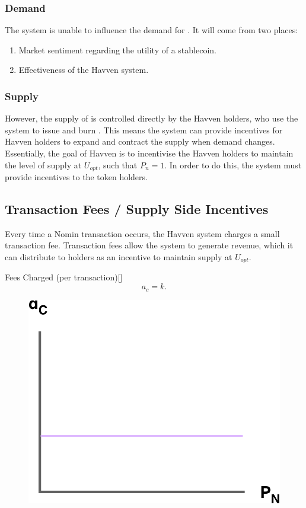 \subsubsection*{Demand}

\noindent The system is unable to influence the demand for \NOM{}. It will come from two places:
 
\begin{enumerate}
\item{Market sentiment regarding the utility of a stablecoin.}
\item{Effectiveness of the Havven system.}
\end{enumerate}
 
\subsubsection*{Supply}

\noindent However, the supply of \NOM{} is controlled directly by the Havven holders, who use the system to issue and burn \NOM{}. This means the system can provide incentives for Havven holders to expand and contract the \NOM{} supply when demand changes. \\

\noindent Essentially, the goal of Havven is to incentivise the Havven holders to maintain the level of \NOM{} supply at $U_{opt}$, such that $P_n = 1$. In order to do this, the system must provide incentives to the \HAV{} token holders.  \\

\newpage

\subsection{Transaction Fees / Supply Side Incentives} Every time a Nomin transaction occurs, the Havven system charges a small transaction fee. Transaction fees allow the system to generate revenue, which it can distribute to \HAV{} holders as an incentive to maintain \NOM{} supply at $U_{opt}$. \\

\begin{namedthm}{Fees Charged (per transaction)}[]
$$ a_c = k.$$
\end{namedthm}

\begin{figure}[h!]
    \centering
    \includegraphics[width=.5\textwidth]{img/fees-charged}
\end{figure}

